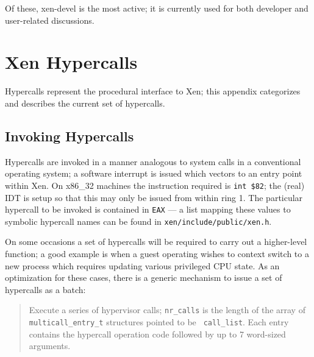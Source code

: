 \documentclass[11pt,twoside,final,openright]{xenstyle}
\begin{document}
Of these, xen-devel is the most active; it is currently used for 
both developer and user-related discussions. 




\appendix






\newcommand{\hypercall}[1]{\vspace{2mm}{\sf #1}}






\chapter{Xen Hypercalls}
\label{a:hypercalls}

Hypercalls represent the procedural interface to Xen; this appendix 
categorizes and describes the current set of hypercalls. 

\section{Invoking Hypercalls} 

Hypercalls are invoked in a manner analogous to system calls in a
conventional operating system; a software interrupt is issued which
vectors to an entry point within Xen. On x86\_32 machines the
instruction required is {\tt int \$82}; the (real) IDT is setup so
that this may only be issued from within ring 1. The particular 
hypercall to be invoked is contained in {\tt EAX} --- a list 
mapping these values to symbolic hypercall names can be found 
in {\tt xen/include/public/xen.h}. 

On some occasions a set of hypercalls will be required to carry
out a higher-level function; a good example is when a guest 
operating wishes to context switch to a new process which 
requires updating various privileged CPU state. As an optimization
for these cases, there is a generic mechanism to issue a set of 
hypercalls as a batch: 

\begin{quote}
\hypercall{multicall(void *call\_list, int nr\_calls)}

Execute a series of hypervisor calls; {\tt nr\_calls} is the length of
the array of {\tt multicall\_entry\_t} structures pointed to be {\tt
call\_list}. Each entry contains the hypercall operation code followed
by up to 7 word-sized arguments.
\end{quote}
\end{document}
